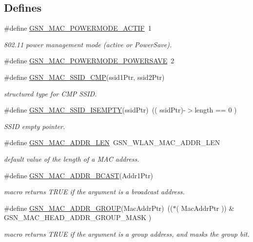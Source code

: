 \subsection*{Defines}
\begin{DoxyCompactItemize}
\item 
\#define \hyperlink{a00642_gac05267227cbd1ea16b61aa98de2050cc}{GSN\_\-MAC\_\-POWERMODE\_\-ACTIF}~1
\begin{DoxyCompactList}\small\item\em 802.11 power management mode (active or PowerSave). \end{DoxyCompactList}\item 
\#define \hyperlink{a00522_ac27051c9054f9ce18951f1f2760ee99d}{GSN\_\-MAC\_\-POWERMODE\_\-POWERSAVE}~2
\item 
\#define \hyperlink{a00642_ga884676614ce794771a22a5ea358a25cf}{GSN\_\-MAC\_\-SSID\_\-CMP}(ssid1Ptr, ssid2Ptr)
\begin{DoxyCompactList}\small\item\em structured type for CMP SSID. \end{DoxyCompactList}\item 
\#define \hyperlink{a00642_ga216e78da30032f04c2c3a222478ed85e}{GSN\_\-MAC\_\-SSID\_\-ISEMPTY}(ssidPtr)~(( ssidPtr)-\/$>$length == 0 )
\begin{DoxyCompactList}\small\item\em SSID empty pointer. \end{DoxyCompactList}\item 
\#define \hyperlink{a00642_gaeeeab57b53de2e9a366c2b883e008f5e}{GSN\_\-MAC\_\-ADDR\_\-LEN}~GSN\_\-WLAN\_\-MAC\_\-ADDR\_\-LEN
\begin{DoxyCompactList}\small\item\em default value of the length of a MAC address. \end{DoxyCompactList}\item 
\#define \hyperlink{a00642_gad81b63f034b99768727bc1514ba5c175}{GSN\_\-MAC\_\-ADDR\_\-BCAST}(Addr1Ptr)
\begin{DoxyCompactList}\small\item\em macro returns TRUE if the argument is a broadcast address. \end{DoxyCompactList}\item 
\#define \hyperlink{a00642_ga95d4817391976ee04a12a20613cacc4c}{GSN\_\-MAC\_\-ADDR\_\-GROUP}(MacAddrPtr)~(($\ast$( MacAddrPtr )) \& GSN\_\-MAC\_\-HEAD\_\-ADDR\_\-GROUP\_\-MASK )
\begin{DoxyCompactList}\small\item\em macro returns TRUE if the argument is a group address, and masks the group bit. \end{DoxyCompactList}\item 

\end{DoxyCompactItemize}
